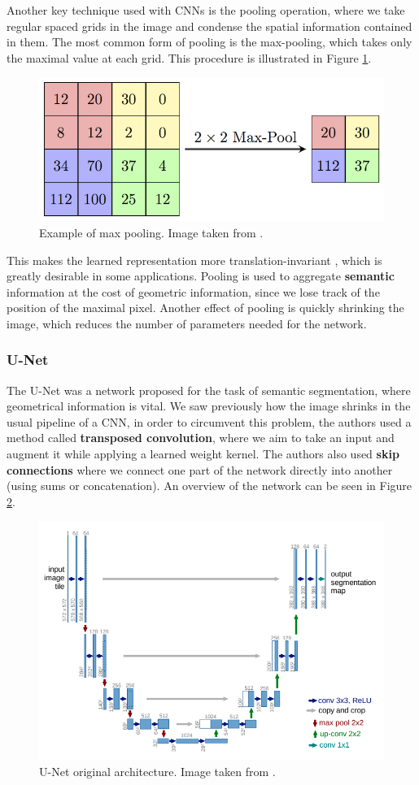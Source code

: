 Another key technique used with CNNs is the pooling operation, where we take regular spaced grids in the image and condense the spatial information contained in them. The most common form of pooling is the max-pooling, which takes only the maximal value at each grid. This procedure is illustrated in Figure \ref{pooling}.

\begin{figure}[H]
    \includegraphics[width=.7\textwidth]{Cap2-Methods/MaxpoolSample2.png}
    \centering
	\caption{Example of max pooling. Image taken from \cite{poolimg}.}
	\label{pooling}
\end{figure}

This makes the learned representation more translation-invariant \cite{dlbook}, which is greatly desirable in some applications. Pooling is used to aggregate \textbf{semantic} information at the cost of geometric information, since we lose track of the position of the maximal pixel. Another effect of pooling is quickly shrinking the image, which reduces the number of parameters needed for the network.

\subsubsection{U-Net}

The U-Net \cite{unet_gordo} was a network proposed for the task of semantic segmentation, where geometrical information is vital. We saw previously how the image shrinks in the usual pipeline of a CNN, in order to circumvent this problem, the authors used a method called \textbf{transposed convolution}, where we aim to take an input and augment it while applying a learned weight kernel. The authors also used \textbf{skip connections} where we connect one part of the network directly into another (using sums or concatenation). An overview of the network can be seen in Figure \ref{unetimg}.

\begin{figure}[H]
    \includegraphics[width=.7\textwidth]{Cap2-Methods/screenshot_1.png}
    \centering
	\caption{U-Net original architecture. Image taken from \cite{unet_gordo}.}
	\label{unetimg}
\end{figure}

